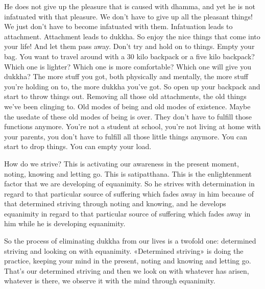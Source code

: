 \documentclass[letterpaper,10pt,english]{sphinxmanual}
\begin{document}
\sphinxAtStartPar
{}
He does not give up the pleasure that is caused with dhamma, and yet he is
not infatuated with that pleasure. We don’t have to give up all the pleasant
things! We just don’t have to become infatuated with them. Infatuation leads
to  attachment. Attachment  leads  to  dukkha.  So  enjoy  the  nice  things  that
come into your life! And let them pass away. Don’t try and hold on to things.
Empty  your  bag. You  want  to  travel  around  with  a  30  kilo  backpack  or  a
five kilo backpack? Which one is lighter? Which one is more comfortable?
Which one will give you dukkha? The more stuff you got, both physically
and mentally, the more stuff you’re holding on to, the more dukkha you’ve
got. So open up your backpack and start to throw things out. Removing all
those old attachments, the old things we’ve been clinging to. Old modes of
being and old modes of existence. Maybe the use\sphinxhyphen{}date of these old modes of
being is over. They don’t have to fulfill those functions anymore. You’re not
a student at school, you’re not living at home with your parents, you don’t
have to fulfill all those little things anymore. You can start to drop things.
You can empty your load.

\sphinxAtStartPar
How do we strive?
This  is  activating  our  awareness  in  the  present  moment,
noting, knowing and letting go. This is satipatthana.
This is the enlightenment factor that we are developing of equanimity. So he strives with determination in regard to that particular source of suffering which fades away in him because of that determined
striving through noting and knowing, and he develops equanimity in regard
to that particular source of suffering which fades away in him while he is
developing equanimity.

\sphinxAtStartPar
So the process of eliminating dukkha from our lives is a two\sphinxhyphen{}fold one:
determined striving and looking on with equanimity. «Determined striving»
is doing the practice, keeping your mind in the present, noting and knowing and letting go. That’s our determined striving and then we look on with
whatever has arisen, whatever is there, we observe it with the mind through
equanimity.
\end{document}
